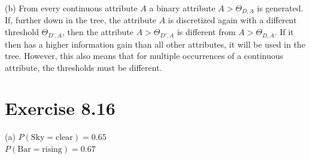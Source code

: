 \documentclass[10pt]{book}
\begin{document}
(b) From every continuous attribute $A$ a binary attribute $A > \Theta_{D, A}$ is generated. If, further down in the tree, the attribute $A$ is discretized again with a different threshold $\Theta_{D', A}$, then the attribute $A > \Theta_{D', A}$ is different from $A > \Theta_{D, A}$. If it then has a higher information gain than all other attributes, it will be used in the tree. However, this also means that for multiple occurrences of a continuous attribute, the thresholds must be different.

\section{Exercise 8.16}
(a) $P(\text{Sky}=\text{clear}) = 0.65$\\
$P(\text{Bar}=\text{rising}) = 0.67$
\end{document}
